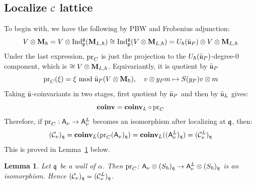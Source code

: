 \documentclass{article}
\theoremstyle{plain}
\newtheorem{lemma}[theorem]{Lemma}
\theoremstyle{definition}
\theoremstyle{remark}
\numberwithin{equation}{section}
\begin{document}
\subsection*{Localize $\mathcal C$ lattice}
To begin with, we have the following by PBW and Frobenius adjunction:
\begin{equation*}
    V\otimes \mathbf{M}_\hbar = V \otimes \operatorname{Ind}_{\mathfrak{p}}^{\mathfrak{g}}(\mathbf{M}_{L,\hbar}) \cong \operatorname{Ind}_{\mathfrak{p}}^{\mathfrak{g}}(V\otimes \mathbf{M}_{L,\hbar}) = U_\hbar(\bar{\mathfrak{u}}_P)\otimes V \otimes \mathbf{M}_{L,\hbar}
\end{equation*}
Under the last expression, $\operatorname{pr}_C$ is just the projection to the $U_\hbar(\bar{\mathfrak{u}}_P)$-degree-0 component, which is $\cong V\otimes\mathbf{M}_{L,\hbar}$. Equivariantly, it is quotient by $\bar{\mathfrak{u}}_P$ 
\begin{equation*}
    \operatorname{pr}_C(\xi) = \xi\, \,\mathrm{mod} \,\,\bar{\mathfrak{u}}_P (V\otimes \mathbf{M}_{\hbar}), \quad v\otimes y_P m \mapsto S(y_P)v\otimes m
\end{equation*}
Taking $\bar{\mathfrak{u}}$-coinvariants in two stages, first quotient by $\bar{\mathfrak{u}}_P$ and then by $\bar{\mathfrak{u}}_L$ gives:
\begin{equation}\label{eq:prC}
    \operatorname{\mathbf{coinv}} = \operatorname{\mathbf{coinv}}_L \circ \operatorname{pr}_C
\end{equation}
Therefore, if $\operatorname{pr}_C: \mathsf A_\nu \to \mathsf A_\nu^L$ becomes an isomorphism after localizing at $\mathfrak q$, then:
\begin{equation*}
   ( \mathcal C_\nu)_\mathfrak q = \operatorname{\mathbf{coinv}}_L (\operatorname{pr}_C (\mathsf A_\nu)_\mathfrak q) = \operatorname{\mathbf{coinv}}_L((\mathsf A_\nu^L)_\mathfrak q) = (\mathcal C_\nu^L)_\mathfrak q
\end{equation*}
This is proved in Lemma~\ref{lem:locC} below.

\begin{lemma}\label{lem:locC}
Let $\mathfrak q$ be a wall of $\alpha$. Then $\mathrm{pr}_C\colon\mathsf A_\nu\otimes(S_\hbar)_\mathfrak q\to\mathsf A^L_\nu\otimes(S_\hbar)_\mathfrak q$ is an isomorphism. Hence $(\mathcal C_\nu)_\mathfrak q=(\mathcal C^L_\nu)_\mathfrak q$.
\end{lemma}
\end{document}

